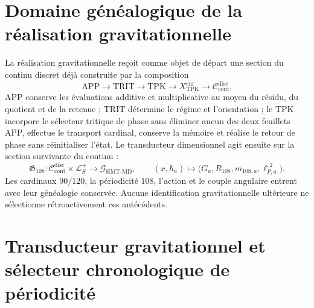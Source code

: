 \section{Domaine généalogique de la réalisation gravitationnelle}
\label{sec:l9s102:gravedad-dominio-genealogico}

La réalisation gravitationnelle reçoit comme objet de départ une section du
continu discret déjà construite par la composition
\begin{equation}
 \mathrm{APP}\longrightarrow\mathrm{TRIT}\longrightarrow\mathrm{TPK}
 \longrightarrow X_{\mathrm{TPK}}^{\mathrm{enr}}
 \longrightarrow\mathcal C_{\mathrm{cont}}^{\mathrm{disc}}.
 \label{eq:l9s102:gravedad-cadena-genealogica}
\end{equation}
APP conserve les évaluations additive et multiplicative au moyen du résidu,
du quotient et de la retenue ; TRIT détermine le régime et l'orientation ; le TPK
incorpore le sélecteur tritique de phase sans éliminer aucun des deux feuillets
APP, effectue le transport cardinal, conserve la mémoire et réalise le retour
de phase sans réinitialiser l'état. Le transducteur
dimensionnel agit ensuite sur la section survivante du continu :
\begin{equation}
 \mathfrak G_{108}:\mathcal C_{\mathrm{cont}}^{\mathrm{disc}}
 \times\mathcal L_S^+
 \longrightarrow\mathcal G_{\mathrm{HMT\text{-}MD}},
 \qquad
 (x,\hbar_a)\longmapsto
 \bigl(G_a,R_{108},m_{108,a},\ell_{P,a}^{,2}\bigr).
 \label{eq:l9s102:gravedad-mapa-realizacion}
\end{equation}
Les cardinaux \(90/120\), la périodicité \(108\), l'action et le couple
angulaire entrent avec leur généalogie conservée. Aucune identification
gravitationnelle ultérieure ne sélectionne rétroactivement ces antécédents.

\section{Transducteur gravitationnel et sélecteur chronologique de périodicité}
\label{sec:l9s102:gravedad-transductor}

